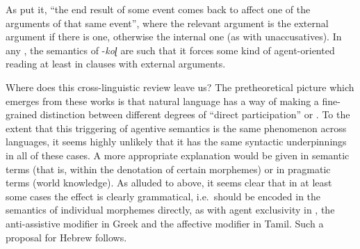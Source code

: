 \begin{exe}
\begin{xlist}
\begin{exe}
\begin{xlist}
\begin{exe}
\begin{xlist}
\begin{exe}
\begin{exe}
\begin{xlist}
\begin{exe}
\begin{xlist}
\begin{exe}
\begin{xlist}
\begin{exe}
\begin{xlist}
\begin{exe}
\begin{xlist}
\begin{exe}
\begin{xlist}
\begin{exe}
\begin{xlist}
\begin{exe}
\begin{xlist}
\begin{exe}
\begin{xlist}
\begin{exe}
\begin{xlist}
\begin{exe}
\begin{xlist}
\begin{exe}
\begin{xlist}
\begin{exe}
\begin{exe}
\begin{xlist}
\begin{exe}
\begin{xlist}
\begin{exe}
\begin{xlist}
\begin{exe}
\begin{xlist}
{\begin{exe}
\begin{xlist}
\begin{exe}
\begin{xlist}
\begin{exe}
\begin{xlist}
\begin{exe}
\begin{xlist}
\begin{xlist}
\begin{xlist}
\begin{exe}
\begin{xlist}
\begin{xlist}
\begin{xlist}
\begin{exe}
\begin{exe}
\begin{xlist}
\begin{exe}
\begin{xlist}
\begin{exe}
\begin{xlist}
\begin{exe}
\begin{xlist}
\begin{exe}
\begin{xlist}
\begin{exe}
\begin{xlist}
\begin{exe}
\begin{exe}
\begin{xlist}
\begin{xlist}
\begin{exe}
\begin{xlist}
\begin{exe}
\begin{xlist}
\begin{exe}
\begin{xlist}
\begin{exe}
\begin{xlist}
As \citet[165]{sundaresanmcfadden17} put it, ``the end result of some event comes back to affect one of the arguments of that same event'', where the relevant argument is the external argument if there is one, otherwise the internal one (as with unaccusatives). In any , the semantics of -\emph{koɭ} are such that it forces some kind of agent-oriented reading at least in clauses with external arguments.

Where does this cross-linguistic review leave us? The pretheoretical picture which emerges from these works is that natural language has a way of making a fine-grained distinction between different degrees of ``direct participation'' or . To the extent that this triggering of agentive semantics is the same phenomenon across languages, it seems highly unlikely that it has the same syntactic underpinnings in all of these cases. A more appropriate explanation would be given in semantic terms (that is, within the denotation of certain morphemes) or in pragmatic terms (world knowledge). As alluded to above, it seems clear that in at least some cases the effect is clearly grammatical, i.e.~should be encoded in the semantics of individual morphemes directly, as with agent exclusivity in , the anti-assistive modifier in Greek and the affective modifier in Tamil. Such a proposal for Hebrew follows.


\end{xlist}
\end{exe}
\end{xlist}
\end{exe}
\end{xlist}
\end{exe}
\end{xlist}
\end{exe}
\end{xlist}
\end{xlist}
\end{exe}
\end{exe}
\end{xlist}
\end{exe}
\end{xlist}
\end{exe}
\end{xlist}
\end{exe}
\end{xlist}
\end{exe}
\end{xlist}
\end{exe}
\end{xlist}
\end{exe}
\end{exe}
\end{xlist}
\end{xlist}
\end{xlist}
\end{exe}
\end{xlist}
\end{xlist}
\end{xlist}
\end{exe}
\end{xlist}
\end{exe}
\end{xlist}
\end{exe}
\end{xlist}
\end{exe}}
\end{xlist}
\end{exe}
\end{xlist}
\end{exe}
\end{xlist}
\end{exe}
\end{xlist}
\end{exe}
\end{exe}
\end{xlist}
\end{exe}
\end{xlist}
\end{exe}
\end{xlist}
\end{exe}
\end{xlist}
\end{exe}
\end{xlist}
\end{exe}
\end{xlist}
\end{exe}
\end{xlist}
\end{exe}
\end{xlist}
\end{exe}
\end{xlist}
\end{exe}
\end{xlist}
\end{exe}
\end{xlist}
\end{exe}
\end{xlist}
\end{exe}
\end{exe}
\end{xlist}
\end{exe}
\end{xlist}
\end{exe}
\end{xlist}
\end{exe}
